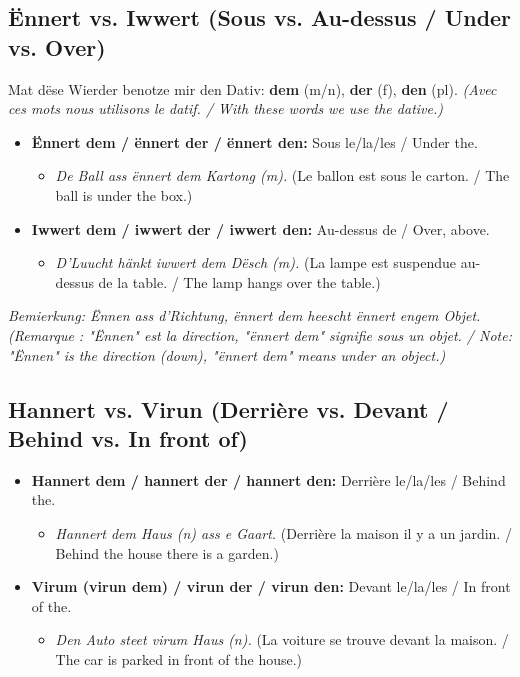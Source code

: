 \subsection*{Ënnert vs. Iwwert (Sous vs. Au-dessus / Under vs. Over)}
Mat dëse Wierder benotze mir den Dativ: \textbf{dem} (m/n), \textbf{der} (f), \textbf{den} (pl). \textit{(Avec ces mots nous utilisons le datif. / With these words we use the dative.)}
\begin{itemize}
    \item \textbf{Ënnert dem / ënnert der / ënnert den:} Sous le/la/les / Under the.
        \begin{itemize}
            \item \textit{De Ball ass ënnert dem Kartong (m).} (Le ballon est sous le carton. / The ball is under the box.)
        \end{itemize}
    \item \textbf{Iwwert dem / iwwert der / iwwert den:} Au-dessus de / Over, above.
        \begin{itemize}
            \item \textit{D'Luucht hänkt iwwert dem Dësch (m).} (La lampe est suspendue au-dessus de la table. / The lamp hangs over the table.)
        \end{itemize}
\end{itemize}
\textit{Bemierkung: Ënnen ass d'Richtung, ënnert dem heescht ënnert engem Objet. (Remarque : "Ënnen" est la direction, "ënnert dem" signifie sous un objet. / Note: "Ënnen" is the direction (down), "ënnert dem" means under an object.)}

\subsection*{Hannert vs. Virun (Derrière vs. Devant / Behind vs. In front of)}
\begin{itemize}
    \item \textbf{Hannert dem / hannert der / hannert den:} Derrière le/la/les / Behind the.
        \begin{itemize}
            \item \textit{Hannert dem Haus (n) ass e Gaart.} (Derrière la maison il y a un jardin. / Behind the house there is a garden.)
        \end{itemize}
    \item \textbf{Virum (virun dem) / virun der / virun den:} Devant le/la/les / In front of the.
        \begin{itemize}
            \item \textit{Den Auto steet virum Haus (n).} (La voiture se trouve devant la maison. / The car is parked in front of the house.)
        \end{itemize}
\end{itemize}

